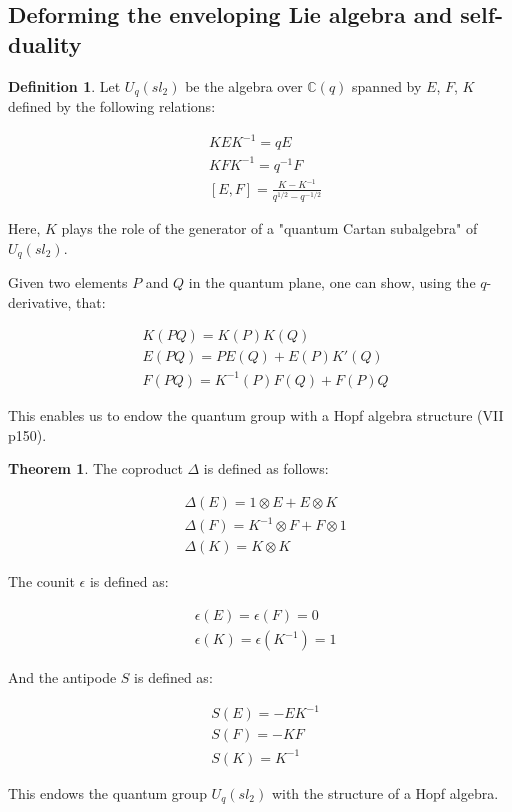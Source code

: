\documentclass[11pt]{article}
\theoremstyle{definition}
\newtheorem{theo}{Theorem}[section]
\newtheorem{Def}{Definition}[section]
\begin{document}
\subsection{\Large \textbf{Deforming the enveloping Lie algebra and self-duality}}

\begin{Def} Let \(U_q(sl_2)\) be the algebra over \(\mathbb{C}(q)\) spanned by \(E\), \(F\), \(K\) defined by the following relations:

\begin{align*}
&KEK^{-1}=qE\\
&KFK^{-1}=q^{-1}F\\
&[E,F]=\frac{K-K^{-1}}{q^{1/2}-q^{-1/2}}
\end{align*}

Here, \(K\) plays the role of the generator of a "quantum Cartan subalgebra" of \(U_q(sl_2)\).
\end{Def}

Given two elements \(P\) and \(Q\) in the quantum plane, one can show, using the \(q\)-derivative, that:

\begin{align}
&K(PQ)=K(P)K(Q)\\
&E(PQ)=PE(Q)+E(P)K'(Q)\\
&F(PQ)=K^{-1}(P)F(Q)+F(P)Q
\end{align}

This enables us to endow the quantum group with a Hopf algebra structure\cite{Kassel} (VII p150).

\begin{theo} The coproduct \(\Delta\) is defined as follows:

\begin{align*}
&\Delta(E)=1\otimes E+E\otimes K\\
&\Delta(F)=K^{-1}\otimes F+F\otimes 1\\
&\Delta(K)=K\otimes K
\end{align*}

The counit \(\epsilon\) is defined as:

\begin{align*}
&\epsilon(E)=\epsilon(F)=0\\
&\epsilon(K)=\epsilon(K^{-1})=1
\end{align*}

And the antipode \(S\) is defined as:

\begin{align*}
&S(E)=-EK^{-1}\\
&S(F)=-KF\\
&S(K)=K^{-1}
\end{align*}

This endows the quantum group \(U_q(sl_2)\) with the structure of a Hopf algebra.
\end{theo}
\end{document}
